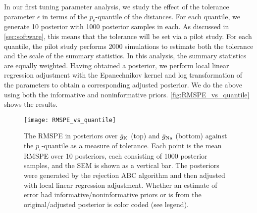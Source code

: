 In our first tuning parameter analysis, we study the effect of the tolerance parameter $\epsilon$ in terms of the $p_\epsilon$-quantile of the distances. For each quantile, we generate 10 posterior with 1000 posterior samples in each. As discussed in \cref{sec:software}, this means that the tolerance will be set via a pilot study. For each quantile, the pilot study performs 2000 simulations to estimate both the tolerance and the scale of the summary statistics. In this analysis, the summary statistics are equally weighted. Having obtained a posterior, we perform local linear regression adjustment with the Epanechnikov kernel and log transformation of the parameters to obtain a corresponding adjusted posterior. We do the above using both the informative and noninformative priors. \autoref{fig:RMSPE_vs_quantile} shows the results.
\begin{figure}[!htb]
    \centering
    \texttt{[image: RMSPE\_vs\_quantile]}
    \caption{The RMSPE in posteriors over $\bar{g}_{\mathrm{K}}$ (top) and $\bar{g}_{\mathrm{Na}}$ (bottom) against the $p_\epsilon$-quantile as a measure of tolerance. Each point is the mean RMSPE over 10 posteriors, each consisting of 1000 posterior samples, and the SEM is shown as a vertical bar. The posteriors were generated by the rejection ABC algorithm and then adjusted with local linear regression adjustment. Whether an estimate of error had informative/noninformative priors or is from the original/adjusted posterior is color coded (see legend).}
    \label{fig:RMSPE_vs_quantile}
\end{figure} 
